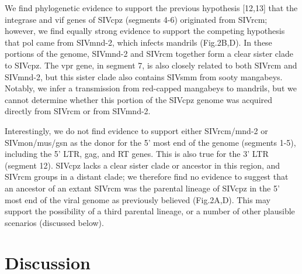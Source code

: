 We find phylogenetic evidence to support the previous hypothesis [12,13] that the integrase and vif genes of SIVcpz (segments 4-6) originated from SIVrcm; however, we find equally strong evidence to support the competing hypothesis that pol came from SIVmnd-2, which infects mandrils (Fig.2B,D).
In these portions of the genome, SIVmnd-2 and SIVrcm together form a clear sister clade to SIVcpz.
The vpr gene, in segment 7, is also closely related to both SIVrcm and SIVmnd-2, but this sister clade also contains SIVsmm from sooty mangabeys.
Notably, we infer a transmission from red-capped mangabeys to mandrils, but we cannot determine whether this portion of the SIVcpz genome was acquired directly from SIVrcm or from SIVmnd-2.

Interestingly, we do not find evidence to support either SIVrcm/mnd-2 or SIVmon/mus/gsn as the donor for the 5’ most end of the genome (segments 1-5), including the 5’ LTR, gag, and RT genes.
This is also true for the 3’ LTR (segment 12).
SIVcpz lacks a clear sister clade or ancestor in this region, and SIVrcm groups in a distant clade; we therefore find no evidence to suggest that an ancestor of an extant SIVrcm was the parental lineage of SIVcpz in the 5’ most end of the viral genome as previously believed (Fig.2A,D).
This may support the possibility of a third parental lineage, or a number of other plausible scenarios (discussed below).


\section{Discussion}

